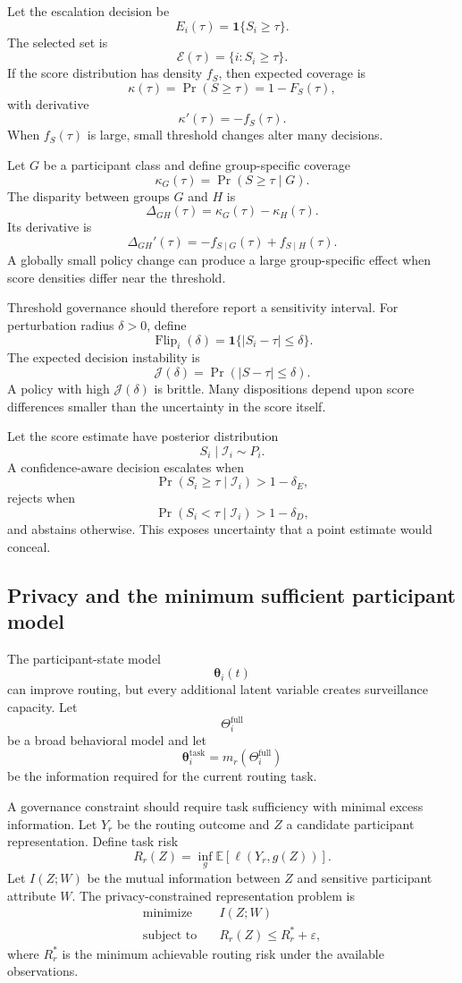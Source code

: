 \documentclass[11pt]{article}
\theoremstyle{definition}
\DeclareMathOperator{\Prob}{Pr}
\newcommand{\E}{\mathbb{E}}
\newcommand{\thetaState}{\boldsymbol{\theta}}
\newcommand{\ind}{\mathbf{1}}
\newcommand{\eps}{\varepsilon}
\begin{document}
Let the escalation decision be
\[
E_i(\tau)
=
\ind\{S_i\geq\tau\}.
\]
The selected set is
\[
\mathcal{E}(\tau)
=
\{i:S_i\geq\tau\}.
\]
If the score distribution has density \(f_S\), then expected coverage is
\[
\kappa(\tau)
=
\Prob(S\geq\tau)
=
1-F_S(\tau),
\]
with derivative
\[
\kappa'(\tau)
=
-f_S(\tau).
\]
When \(f_S(\tau)\) is large, small threshold changes alter many decisions.

Let \(G\) be a participant class and define group-specific coverage
\[
\kappa_G(\tau)
=
\Prob(S\geq\tau\mid G).
\]
The disparity between groups \(G\) and \(H\) is
\[
\Delta_{GH}(\tau)
=
\kappa_G(\tau)-\kappa_H(\tau).
\]
Its derivative is
\[
\Delta_{GH}'(\tau)
=
-f_{S\mid G}(\tau)+f_{S\mid H}(\tau).
\]
A globally small policy change can produce a large group-specific effect when score densities differ near the threshold.

Threshold governance should therefore report a sensitivity interval. For perturbation radius \(\delta>0\), define
\[
\operatorname{Flip}_i(\delta)
=
\ind\{
|S_i-\tau|\leq\delta
\}.
\]
The expected decision instability is
\[
\mathcal{J}(\delta)
=
\Prob(|S-\tau|\leq\delta).
\]
A policy with high \(\mathcal{J}(\delta)\) is brittle. Many dispositions depend upon score differences smaller than the uncertainty in the score itself.

Let the score estimate have posterior distribution
\[
S_i\mid\mathscr{I}_i
\sim P_i.
\]
A confidence-aware decision escalates when
\[
\Prob(S_i\geq\tau\mid\mathscr{I}_i)
>
1-\delta_E,
\]
rejects when
\[
\Prob(S_i<\tau\mid\mathscr{I}_i)
>
1-\delta_D,
\]
and abstains otherwise. This exposes uncertainty that a point estimate would conceal.

\subsection{Privacy and the minimum sufficient participant model}

The participant-state model
\[
\thetaState_i(t)
\]
can improve routing, but every additional latent variable creates surveillance capacity. Let
\[
\Theta_i^{\mathrm{full}}
\]
be a broad behavioral model and let
\[
\thetaState_i^{\mathrm{task}}
=
m_r(\Theta_i^{\mathrm{full}})
\]
be the information required for the current routing task.

A governance constraint should require task sufficiency with minimal excess information. Let \(Y_r\) be the routing outcome and \(Z\) a candidate participant representation. Define task risk
\[
R_r(Z)
=
\inf_g
\E[
\ell(Y_r,g(Z))
].
\]
Let \(I(Z;W)\) be the mutual information between \(Z\) and sensitive participant attribute \(W\). The privacy-constrained representation problem is
\[
\begin{aligned}
\text{minimize}\quad&
I(Z;W)
\\
\text{subject to}\quad&
R_r(Z)\leq R_r^{*}+\eps,
\end{aligned}
\]
where \(R_r^{*}\) is the minimum achievable routing risk under the available observations.
\end{document}
